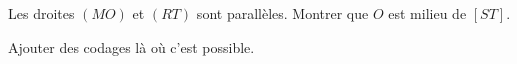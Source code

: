 
\begin{exercice}\label{exosmath-1001}

    Les droites \( (MO)\) et \( (RT)\) sont parallèles. Montrer que \( O\) est milieu de \( [ST]\).

    \begin{center}

    \end{center}

    Ajouter des codages là où c'est possible.

\end{exercice}
